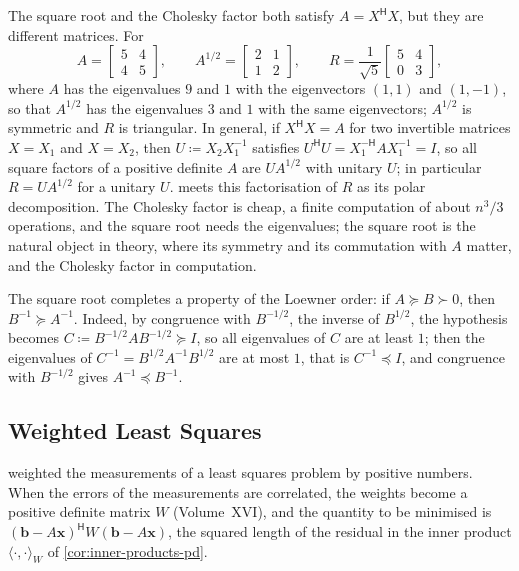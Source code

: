The square root and the Cholesky factor both satisfy $A=X^{\mathsf H}X$, but they are different matrices. For
\[
A=\begin{bmatrix}5&4\\4&5\end{bmatrix},\qquad A^{1/2}=\begin{bmatrix}2&1\\1&2\end{bmatrix},\qquad R=\frac1{\sqrt5}\begin{bmatrix}5&4\\0&3\end{bmatrix},
\]
where $A$ has the eigenvalues $9$ and $1$ with the eigenvectors $(1,1)$ and $(1,-1)$, so that $A^{1/2}$ has the eigenvalues $3$ and $1$ with the same eigenvectors; $A^{1/2}$ is symmetric and $R$ is triangular. In general, if $X^{\mathsf H}X=A$ for two invertible matrices $X=X_1$ and $X=X_2$, then $U\coloneqq X_2X_1^{-1}$ satisfies $U^{\mathsf H}U=X_1^{-\mathsf H}AX_1^{-1}=I$, so all square factors of a positive definite $A$ are $UA^{1/2}$ with unitary $U$; in particular $R=UA^{1/2}$ for a unitary $U$.  meets this factorisation of $R$ as its polar decomposition. The Cholesky factor is cheap, a finite computation of about $n^3/3$ operations, and the square root needs the eigenvalues; the square root is the natural object in theory, where its symmetry and its commutation with $A$ matter, and the Cholesky factor in computation.

The square root completes a property of the Loewner order: if $A\succeq B\succ0$, then $B^{-1}\succeq A^{-1}$. Indeed, by congruence with $B^{-1/2}$, the inverse of $B^{1/2}$, the hypothesis becomes $C\coloneqq B^{-1/2}AB^{-1/2}\succeq I$, so all eigenvalues of $C$ are at least $1$; then the eigenvalues of $C^{-1}=B^{1/2}A^{-1}B^{1/2}$ are at most $1$, that is $C^{-1}\preceq I$, and congruence with $B^{-1/2}$ gives $A^{-1}\preceq B^{-1}$.

\subsection{Weighted Least Squares}

 weighted the measurements of a least squares problem by positive numbers. When the errors of the measurements are correlated, the weights become a positive definite matrix $W$ (Volume~XVI), and the quantity to be minimised is $(\mathbf b-A\mathbf x)^{\mathsf H}W(\mathbf b-A\mathbf x)$, the squared length of the residual in the inner product $\langle\cdot,\cdot\rangle_W$ of \cref{cor:inner-products-pd}.

